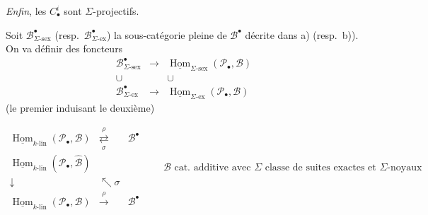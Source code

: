 \documentclass[11pt,a4paper]{article}
\begin{document}
\emph{Enfin}, les $C^i_{\bullet}$ sont $\Sigma$-projectifs.

Soit $\mathcal{B}^{\bullet}_{\Sigma\text{-sex}}$ (resp.\ $\mathcal{B}^{\bullet}_{\Sigma\text{-ex}}$) la
sous-catégorie pleine de $\mathcal{B}^{\bullet}$ décrite dans a) (resp.\ b)).
On va définir des foncteurs
\[
\begin{array}{ccc}
\mathcal{B}^{\bullet}_{\Sigma\text{-sex}} & \longrightarrow & \underline{\operatorname{Hom}}_{\Sigma\text{-sex}}(\mathcal{P}_{\bullet}, \mathcal{B}) \\
\cup & & \cup \\
\mathcal{B}^{\bullet}_{\Sigma\text{-ex}} & \longrightarrow & \underline{\operatorname{Hom}}_{\Sigma\text{-ex}}(\mathcal{P}_{\bullet}, \mathcal{B})
\end{array}
\]
(le premier induisant le deuxième)

\[
\begin{array}{ccc}
\underline{\operatorname{Hom}}_{k\text{-lin}}(\mathcal{P}_{\bullet}, \mathcal{B}) & \underset{\sigma}{\overset{\rho}{\rightleftarrows}} & \mathcal{B}^{\bullet} \\
\underline{\operatorname{Hom}}_{k\text{-lin}}(\mathcal{P}_{\bullet}, \widehat{\mathcal{B}}) & & \\
\downarrow & \nwarrow{\scriptstyle \sigma} & \\
\underline{\operatorname{Hom}}_{k\text{-lin}}(\mathcal{P}_{\bullet}, \mathcal{B}) & \xrightarrow{\ \rho\ } & \mathcal{B}^{\bullet}
\end{array}
\qquad \text{$\mathcal{B}$ cat.\ additive avec $\Sigma$ classe de suites exactes et $\Sigma$-noyaux}
\]
\end{document}
